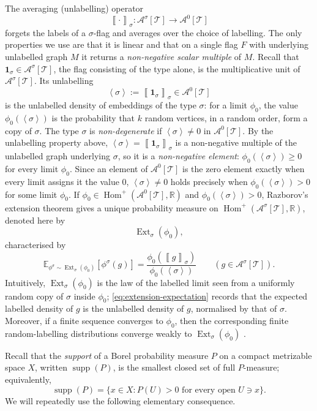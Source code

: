 \documentclass[11pt]{article}
\theoremstyle{definition}
\newcommand{\R}{\mathbb{R}}
\newcommand{\E}{\mathbb{E}}
\newcommand{\A}{\mathcal{A}}
\newcommand{\T}{\mathcal{T}}
\newcommand{\Homp}{\operatorname{Hom}^{+}}
\newcommand{\Ext}{\operatorname{Ext}}
\newcommand{\supp}{\operatorname{supp}}
\newcommand{\brak}[1]{\left\langle #1\right\rangle}
\newcommand{\avg}[2]{\left\llbracket #1 \right\rrbracket_{#2}}
\newcommand{\one}{\mathbf 1}
\begin{document}
The averaging (unlabelling) operator
\[
  \avg{\cdot}{\sigma}:\A^\sigma[\T]\to\A^0[\T]
\]
forgets the labels of a $\sigma$-flag and averages over the choice of labelling.  The
only properties we use are that it is linear and that on a single flag $F$ with
underlying unlabelled graph $M$ it returns a \emph{non-negative scalar multiple}
of $M$.  Recall that $\one_\sigma\in\A^\sigma[\T]$, the flag consisting of the type alone, is the
multiplicative unit of $\A^\sigma[\T]$.  Its unlabelling
\[
  \brak{\sigma}:=\avg{\one_\sigma}{\sigma}\in\A^0[\T]
\]
is the unlabelled density of embeddings of the type $\sigma$: for a limit
$\phi_0$, the value $\phi_0(\brak\sigma)$ is the probability that $k$ random vertices, in
a random order, form a copy of $\sigma$.  The type $\sigma$ is
\emph{non-degenerate} if $\brak\sigma\neq0$ in $\A^0[\T]$.  By the unlabelling property
above, $\brak\sigma=\avg{\one_\sigma}{\sigma}$ is a non-negative multiple of the unlabelled
graph underlying $\sigma$, so it is a \emph{non-negative element}: $\phi_0(\brak\sigma)\ge0$
for every limit $\phi_0$.  Since an
element of $\A^0[\T]$ is the zero element exactly when every limit assigns it the value
$0$, $\brak\sigma\neq0$ holds precisely when $\phi_0(\brak\sigma)>0$ for some limit
$\phi_0$.  If
$\phi_0\in\Homp(\A^0[\T],\R)$ and $\phi_0(\brak\sigma)>0$, Razborov's extension
theorem gives a unique probability measure on
$\Homp(\A^\sigma[\T],\R)$, denoted here by
\[
  \Ext_\sigma(\phi_0),
\]
characterised by
\begin{equation}\label{eq:extension-expectation}
  \E_{\phi^\sigma\sim\Ext_\sigma(\phi_0)}[\phi^\sigma(g)]
  =
  \frac{\phi_0(\avg{g}{\sigma})}{\phi_0(\brak\sigma)}
  \qquad(g\in\A^\sigma[\T]).
\end{equation}
Intuitively, $\Ext_\sigma(\phi_0)$ is the law of the labelled limit seen from a uniformly
random copy of $\sigma$ inside $\phi_0$; \eqref{eq:extension-expectation} records that
the expected labelled density of $g$ is the unlabelled density of $g$, normalised by that
of $\sigma$.  Moreover, if a finite sequence converges to $\phi_0$, then the
corresponding finite random-labelling distributions converge weakly to $\Ext_\sigma(\phi_0)$
\cite[Theorems 3.5 and 3.12]{Razborov2007}.

Recall that the \emph{support} of a Borel probability measure $P$ on a compact metrizable
space $X$, written $\supp(P)$, is the smallest closed set of full $P$-measure; equivalently,
\[
  \supp(P)=\{x\in X:P(U)>0\text{ for every open }U\ni x\}.
\]
We will repeatedly use the following elementary consequence.
\end{document}
